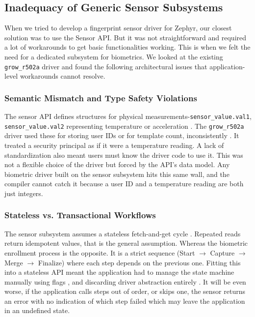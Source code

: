 \subsection{Inadequacy of Generic Sensor Subsystems}
\label{sec:sensor_limitations}

When we tried to develop a fingerprint sensor driver for Zephyr, our closest solution was to use the Sensor API. But it was not straightforward and required a lot of workarounds to get basic functionalities working. This is when we felt the need for a dedicated subsystem for biometrics. We looked at the existing \texttt{grow\_r502a} driver \cite{zephyr_r502a} and found the following architectural issues that application-level workarounds cannot resolve.

\subsubsection{Semantic Mismatch and Type Safety Violations}
The sensor API defines structures for physical measurements-\texttt{sensor\_value.val1}, \texttt{sensor\_value.val2} representing temperature or acceleration \cite{zephyr_sensor_api}. The \texttt{grow\_r502a} driver used these for storing user IDs or for template count, inconsistently \cite{zephyr_r502a_sample}. It treated a security principal as if it were a temperature reading. A lack of standardization also meant users must know the driver code to use it. This was not a flexible choice of the driver but forced by the API's data model. Any biometric driver built on the sensor subsystem hits this same wall, and the compiler cannot catch it because a user ID and a temperature reading are both just integers.

\subsubsection{Stateless vs. Transactional Workflows}
The sensor subsystem assumes a stateless fetch-and-get cycle \cite{zephyr_sensor_api}. Repeated reads return idempotent values, that is the general assumption. Whereas the biometric enrollment process is the opposite. It is a strict sequence (Start $\rightarrow$ Capture $\rightarrow$ Merge $\rightarrow$ Finalize) where each step depends on the previous one. Fitting this into a stateless API meant the application had to manage the state machine manually using flags \cite{zephyr_r502a}, and discarding driver abstraction entirely \cite{zephyr_driver}. It will be even worse, if the application calls steps out of order, or skips one, the sensor returns an error with no indication of which step failed which may leave the application in an undefined state.


